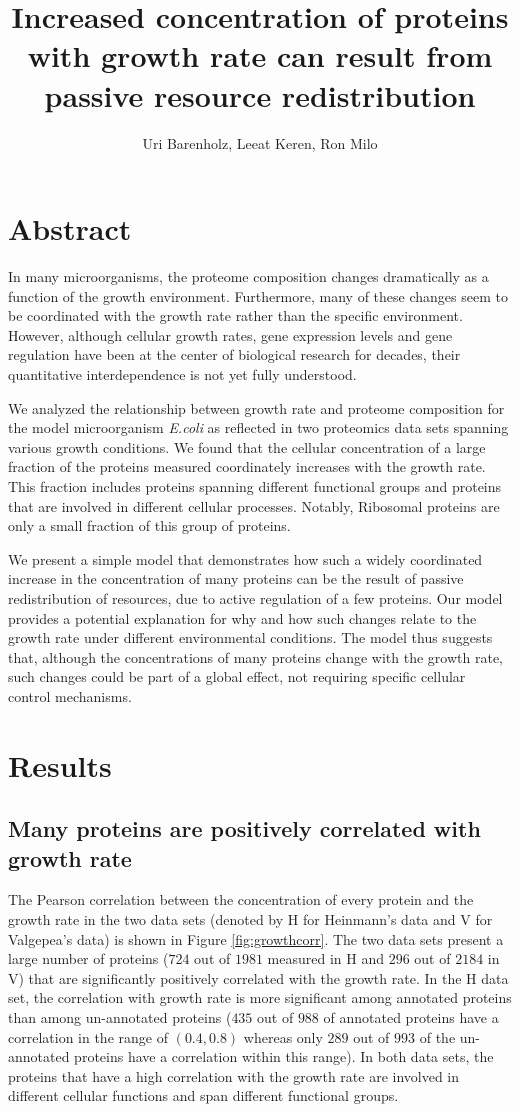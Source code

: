 \documentclass[a4paper,landscape,titlepage,17pt]{extarticle}
\title{\Huge Increased concentration of proteins with growth rate can result from passive resource redistribution}
\author{\Large Uri Barenholz, Leeat Keren, Ron Milo}
\affil{The Weizmann Institute of Science, Rehovot, Israel}
\date{}
\begin{document}
\maketitle
\section*{\LARGE Abstract}
In many microorganisms, the proteome composition changes dramatically as a function of the growth environment.
Furthermore, many of these changes seem to be coordinated with the growth rate rather than the specific environment.
However, although cellular growth rates, gene expression levels and gene regulation have been at the center of biological research for decades, their quantitative interdependence is not yet fully understood.

We analyzed the relationship between growth rate and proteome composition for the model microorganism \emph{E.coli} as reflected in two proteomics data sets spanning various growth conditions.
We found that the cellular concentration of a large fraction of the proteins measured coordinately increases with the growth rate.
This fraction includes proteins spanning different functional groups and proteins that are involved in different cellular processes.
Notably, Ribosomal proteins are only a small fraction of this group of proteins.

We present a simple model that demonstrates how such a widely coordinated increase in the concentration of many proteins can be the result of passive redistribution of resources, due to active regulation of a few proteins.
Our model provides a potential explanation for why and how such changes relate to the growth rate under different environmental conditions.
The model thus suggests that, although the concentrations of many proteins change with the growth rate, such changes could be part of a global effect, not requiring specific cellular control mechanisms.
\clearpage        
\section*{\LARGE Results}
\subsection*{Many proteins are positively correlated with growth rate}
The Pearson correlation between the concentration of every protein and the growth rate in the two data sets (denoted by H for Heinmann's data and V for Valgepea's data) is shown in Figure \ref{fig:growthcorr}.
The two data sets present a large number of proteins ($724$ out of $1981$ measured in H and $296$ out of $2184$ in V) that are significantly positively correlated with the growth rate.
In the H data set, the correlation with growth rate is more significant among annotated proteins than among un-annotated proteins ($435$ out of $988$ of annotated proteins have a correlation in the range of $(0.4,0.8)$ whereas only $289$ out of $993$ of the un-annotated proteins have a correlation within this range).
In both data sets, the proteins that have a high correlation with the growth rate are involved in different cellular functions and span different functional groups.
\end{document}
